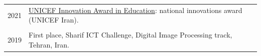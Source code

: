
\vspace{2mm}

\begin{tabularx}{\textwidth}{r X}
  \textsc{2021} & \href{https://www.unicef.org/iran/en/press-releases/unicef-and-vice-presidency-science-and-technology-hold-national-innovations-award}{UNICEF Innovation Award in Education}: national innovations award (UNICEF Iran).
  \\
  \vspace{-3mm}\\
  \textsc{2019} & First place, Sharif ICT Challenge, Digital Image Processing track, Tehran, Iran.
\end{tabularx}
